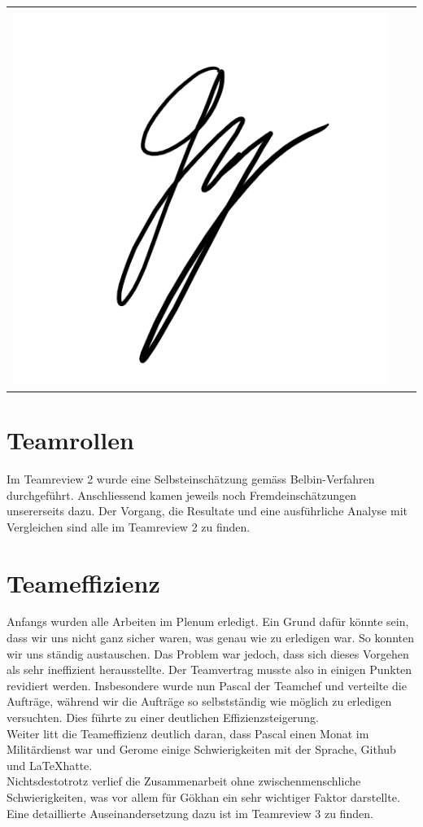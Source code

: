 \begin{tabular}{p{4cm}p{5cm}p{5.5cm}}
\includegraphics[scale=0.6]{img/unterschriftGoekhan}
\end{tabular}

\section{Teamrollen}

Im Teamreview 2 wurde eine Selbsteinschätzung gemäss Belbin-Verfahren durchgeführt. Anschliessend kamen jeweils noch Fremdeinschätzungen unsererseits dazu. Der Vorgang, die Resultate und eine ausführliche Analyse mit Vergleichen sind alle im Teamreview 2 zu finden. 

\section{Teameffizienz}

Anfangs wurden alle Arbeiten im Plenum erledigt. Ein Grund dafür könnte sein, dass wir uns nicht ganz sicher waren, was genau wie zu erledigen war. So konnten wir uns ständig austauschen. Das Problem war jedoch, dass sich dieses Vorgehen als sehr ineffizient herausstellte. Der Teamvertrag musste also in einigen Punkten revidiert werden. Insbesondere wurde nun Pascal der Teamchef und verteilte die Aufträge, während wir die Aufträge so selbstständig wie möglich zu erledigen versuchten. Dies führte zu einer deutlichen Effizienzsteigerung. \\
Weiter litt die Teameffizienz deutlich daran, dass Pascal einen Monat im Militärdienst war und Gerome einige Schwierigkeiten mit der Sprache, Github und \LaTeX hatte. \\
Nichtsdestotrotz verlief die Zusammenarbeit ohne zwischenmenschliche Schwierigkeiten, was vor allem für Gökhan ein sehr wichtiger Faktor darstellte.  \\
Eine detaillierte Auseinandersetzung dazu ist im Teamreview 3 zu finden.  
